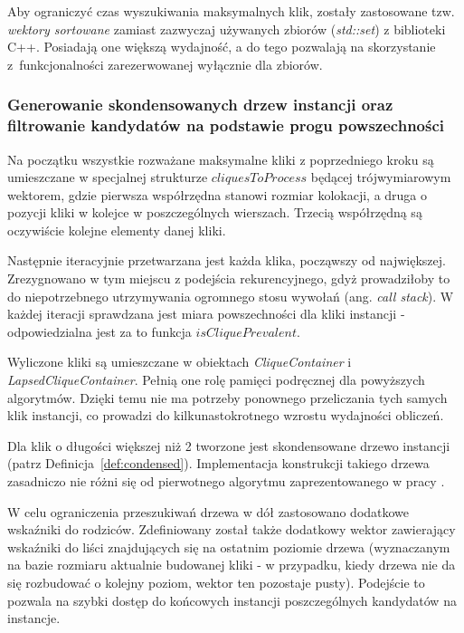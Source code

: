 \documentclass[12pt]{article}
\begin{document}
Aby ograniczyć czas wyszukiwania maksymalnych klik, zostały zastosowane tzw. \textit{wektory sortowane} zamiast zazwyczaj używanych zbiorów (\textit{std::set}) z biblioteki C++. Posiadają one większą wydajność, a do tego pozwalają na skorzystanie z~funkcjonalności zarezerwowanej wyłącznie dla zbiorów.

\subsubsection{Generowanie skondensowanych drzew instancji oraz filtrowanie kandydatów na podstawie progu powszechności}

Na początku wszystkie rozważane maksymalne kliki z poprzedniego kroku są umieszczane w specjalnej strukturze $ cliquesToProcess $ będącej trójwymiarowym wektorem, gdzie pierwsza współrzędna stanowi rozmiar kolokacji, a druga o pozycji kliki w kolejce w poszczególnych wierszach. Trzecią współrzędną są oczywiście kolejne elementy danej kliki.

Następnie iteracyjnie przetwarzana jest każda klika, począwszy od największej. Zrezygnowano w tym miejscu z podejścia rekurencyjnego, gdyż prowadziłoby to do niepotrzebnego utrzymywania ogromnego stosu wywołań (ang. \textit{call stack}). W każdej iteracji sprawdzana jest miara powszechności dla kliki instancji - odpowiedzialna jest za to funkcja $ isCliquePrevalent $. 

Wyliczone kliki są umieszczane w obiektach \textit{CliqueContainer} i \textit{LapsedCliqueContainer}. Pełnią one rolę pamięci podręcznej dla powyższych algorytmów. Dzięki temu nie ma potrzeby ponownego przeliczania tych samych klik instancji, co prowadzi do kilkunastokrotnego wzrostu wydajności obliczeń.

Dla klik o długości większej niż 2 tworzone jest skondensowane drzewo instancji (patrz Definicja~\ref{def:condensed}). Implementacja konstrukcji takiego drzewa zasadniczo nie różni się od pierwotnego algorytmu zaprezentowanego w pracy \cite{chinczyki}.

W celu ograniczenia przeszukiwań drzewa w dół zastosowano dodatkowe wskaźniki do rodziców. Zdefiniowany został także dodatkowy wektor zawierający wskaźniki do liści znajdujących się na ostatnim poziomie drzewa (wyznaczanym na bazie rozmiaru aktualnie budowanej kliki - w przypadku, kiedy drzewa nie da się rozbudować o kolejny poziom, wektor ten pozostaje pusty). Podejście to pozwala na szybki dostęp do końcowych instancji poszczególnych kandydatów na instancje.
\end{document}
